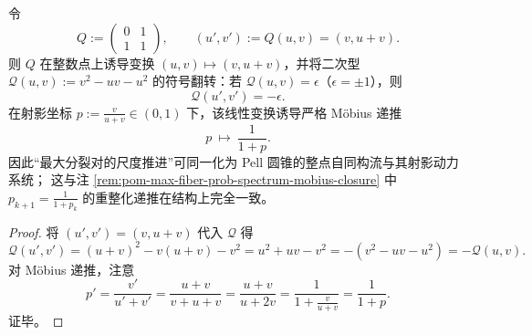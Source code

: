 \begin{proposition}\label{prop:pom-pell-cone-automorphism-mobius}
令
\[
Q:=\begin{pmatrix}0&1\\ 1&1\end{pmatrix},
\qquad
(u',v'):=Q(u,v)=(v,u+v).
\]
则 \(Q\) 在整数点上诱导变换 \((u,v)\mapsto(v,u+v)\)，并将二次型
\(
\mathcal{Q}(u,v):=v^2-uv-u^2
\)
的符号翻转：若 \(\mathcal{Q}(u,v)=\epsilon\)（\(\epsilon=\pm 1\)），则
\[
\boxed{\;\mathcal{Q}(u',v')=-\epsilon.\;}
\]
在射影坐标
\(
p:=\frac{v}{u+v}\in(0,1)
\)
下，该线性变换诱导严格 Möbius 递推
\[
\boxed{\;p\ \longmapsto\ \frac{1}{1+p}.\;}
\]
因此“最大分裂对的尺度推进”可同一化为 Pell 圆锥的整点自同构流与其射影动力系统；
这与注 \ref{rem:pom-max-fiber-prob-spectrum-mobius-closure} 中 \(p_{k+1}=\frac{1}{1+p_k}\) 的重整化递推在结构上完全一致。
\end{proposition}
\begin{proof}
将 \((u',v')=(v,u+v)\) 代入 \(\mathcal{Q}\) 得
\[
\mathcal{Q}(u',v')
=(u+v)^2-v(u+v)-v^2
=u^2+uv-v^2
=-(v^2-uv-u^2)
=-\mathcal{Q}(u,v).
\]
对 Möbius 递推，注意
\[
p'=\frac{v'}{u'+v'}=\frac{u+v}{v+u+v}=\frac{u+v}{u+2v}
=\frac{1}{1+\frac{v}{u+v}}=\frac{1}{1+p}.
\]
证毕。
\end{proof}

\endinput
